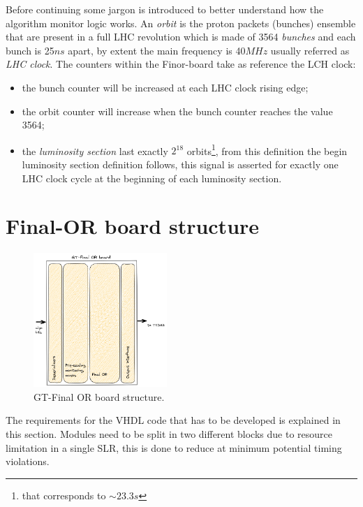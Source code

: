 \documentclass[../../main.tex]{subfiles}
\begin{document}
Before continuing some jargon is introduced to better understand how the algorithm monitor logic works. An \textit{orbit} is the proton packets (bunches) ensemble that are present in a full LHC revolution which is made of 3564 \textit{bunches} and each bunch is 25$ns$ apart, by extent the main frequency is 40$MHz$ usually referred as \textit{LHC clock}. The counters within the Finor-board take as reference the LCH clock: 
\begin{itemize}
    \item the bunch counter will be increased at each LHC clock rising edge;
    \item the orbit counter will increase when the bunch counter reaches the value 3564;
    \item the \textit{luminosity section} last exactly $2^{18}$ orbits\footnote{that corresponds to $\sim 23.3s$}, from this definition the begin luminosity section definition follows, this signal is asserted for exactly one LHC clock cycle at the beginning of each luminosity section.
\end{itemize}

\section{Final-OR board structure}
\label{sec:Finor_struct}

\begin{figure}
    \centering
    \includegraphics[width=0.45\textwidth]{sections/06/Images/GT-finor.png}
    \caption{GT-Final OR board structure.}
    \label{fig:GT-finor}
\end{figure}

The requirements for the VHDL code that has to be developed is explained in this section. Modules need to be split in two different blocks due to resource limitation in a single SLR, this is done to reduce at minimum potential timing violations.  
\end{document}
